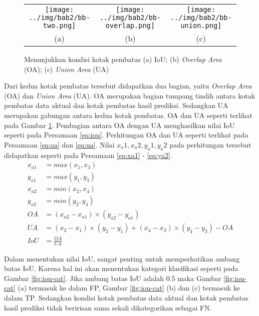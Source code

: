 \begin{figure}[H]
    \centering
    \begin{tabular}{ccc}
        \texttt{[image: ../img/bab2/bb-two.png]}
        &
        \texttt{[image: ../img/bab2/bb-overlap.png]}
        &
        \texttt{[image: ../img/bab2/bb-union.png]}\\
        (a) &(b) &(c)\\
    \end{tabular}
    \caption{Menunjukkan kondisi kotak pembatas (a) IoU; (b) \textit{Overlap Area} (OA); (c) \textit{Union Area} (UA)}
    \label{fig:iou-cond}
\end{figure}

Dari kedua kotak pembatas tersebut didapatkan dua bagian, yaitu \textit{Overlap Area} (OA) dan \textit{Union Area} (UA). OA merupakan bagian tumpang tindih antara kotak pembatas data aktual dan kotak pembatas hasil prediksi. Sedangkan UA merupakan gabungan antara kedua kotak pembatas. OA dan UA seperti terlihat pada Gambar \ref{fig:iou-cond}. Pembagian antara OA dengan UA menghasilkan nilai IoU seperti pada Persamaan \ref{eq:iou}. Perhitungan OA dan UA seperti terlihat pada Persamaan \ref{eq:oa} dan \ref{eq:ua}. Nilai $x_a1, x_a2, y_a1, y_a2$ pada perhitungan tersebut didapatkan seperti pada Persamaan \ref{eq:xa1} - \ref{eq:ya2}.
\begin{align}
    \label{eq:xa1}
    x_{a1} &= max(x_1, x_3)\\
    \label{eq:ya1}
    y_{a1} &= max(y_1, y_3)\\
    \label{eq:xa2}
    x_{a2} &= min(x_2, x_4)\\
    \label{eq:ya2}
    y_{a2} &= min(y_2, y_4)\\
    \label{eq:oa}
    OA     &= (x_{a2}-x_{a1})\times (y_{a2}-y_{a1})\\
    \label{eq:ua}
    UA     &= (x_2-x_1)\times (y_2-y_1) + (x_4-x_3)\times (y_4-y_3) - OA\\
    \label{eq:iou}
    IoU    &= \frac{OA}{UA}
\end{align}

Dalam menentukan nilai IoU, sangat penting untuk memperhatikan ambang batas IoU. Karena hal ini akan menentukan kategori klasifikasi seperti pada Gambar \ref{fig:iou-cat}. Jika ambang batas IoU adalah $0.5$ maka Gambar \ref{fig:iou-cat} (a) termasuk ke dalam FP, Gambar \ref{fig:iou-cat} (b) dan (c) termasuk ke dalam TP. Sedangkan kondisi kotak pembatas data aktual dan kotak pembatas hasil prediksi tidak beririsan sama sekali dikategorikan sebagai FN.

